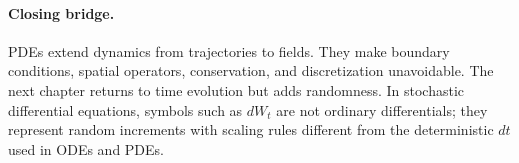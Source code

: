 \paragraph{Closing bridge.}
PDEs extend dynamics from trajectories to fields. They make boundary conditions, spatial operators, conservation, and discretization unavoidable. The next chapter returns to time evolution but adds randomness. In stochastic differential equations, symbols such as \(dW_t\) are not ordinary differentials; they represent random increments with scaling rules different from the deterministic \(dt\) used in ODEs and PDEs.

\clearpage
